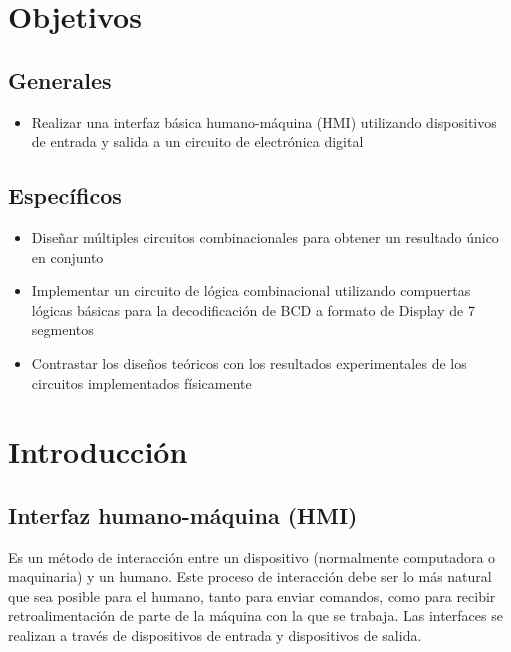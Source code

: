 
\section*{Objetivos}
\subsection*{Generales}
\begin{itemize}
    \item Realizar una interfaz básica humano-máquina (HMI) utilizando dispositivos de entrada y salida a un circuito de electrónica digital
\end{itemize}

\subsection*{Específicos}
\begin{itemize}
    \item Diseñar múltiples circuitos combinacionales para obtener un resultado único en conjunto
    \item Implementar un circuito de lógica combinacional utilizando compuertas lógicas básicas para la decodificación de BCD a formato de Display de 7 segmentos
    \item Contrastar los diseños teóricos con los resultados experimentales de los circuitos implementados físicamente
\end{itemize}

\section{Introducción}

\subsection{Interfaz humano-máquina (HMI)}
Es un método de interacción entre un dispositivo (normalmente computadora o maquinaria) y un humano. Este proceso de interacción debe ser lo más natural que sea posible para el humano, 
tanto para enviar comandos, como para recibir retroalimentación de parte de la máquina con la que se trabaja. Las interfaces se realizan a través de dispositivos de entrada y dispositivos de salida.

